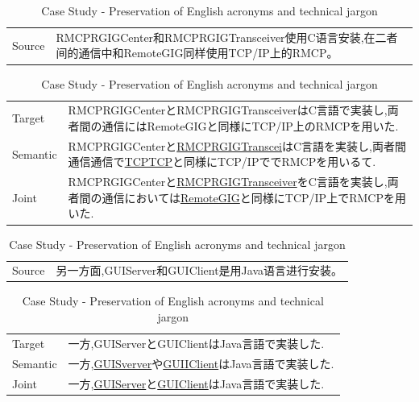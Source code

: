 \vspace{0.4cm}
\begin{table}[h]
    \centering

    \begin{CJK}{UTF8}{gbsn}
        \begin{tabularx}{\textwidth}{p{1.2cm}b}\toprule
            Source & RMCPRGIGCenter和RMCPRGIGTransceiver使用C语言安装,在二者间的通信中和RemoteGIG同样使用TCP/IP上的RMCP。 \\
        \end{tabularx}
    \end{CJK}

    \begin{CJK}{UTF8}{ipxm}
        \begin{tabularx}{\textwidth}{p{1.2cm}b}
            Target & RMCPRGIGCenterとRMCPRGIGTransceiverはC言語で実装し,両者間の通信にはRemoteGIGと同様にTCP/IP上のRMCPを用いた. \\
            Semantic & RMCPRGIGCenterと\underline{RMCPRGIGTranscei}はC言語を実装し,両者間通信通信で\underline{TCPTCP}と同様にTCP/IPででRMCPを用いるて. \\
            Joint & RMCPRGIGCenterと\underline{RMCPRGIGTransceiver}をC言語を実装し,両者間の通信においては\underline{RemoteGIG}と同様にTCP/IP上でRMCPを用いた. \\\midrule
        \end{tabularx}
    \end{CJK}

    \begin{CJK}{UTF8}{gbsn}
        \begin{tabularx}{\textwidth}{p{1.2cm}b}
            Source & 另一方面,GUIServer和GUIClient是用Java语言进行安装。 \\
        \end{tabularx}
    \end{CJK}

    \begin{CJK}{UTF8}{ipxm}
        \begin{tabularx}{\textwidth}{p{1.2cm}b}
            Target & 一方,GUIServerとGUIClientはJava言語で実装した. \\
            Semantic & 一方,\underline{GUISverver}や\underline{GUIIClient}はJava言語で実装した. \\
            Joint & 一方,\underline{GUIServer}と\underline{GUIClient}はJava言語で実装した. \\\midrule
        \end{tabularx}
    \end{CJK}

    \caption{Case Study - Preservation of English acronyms and technical jargon}
    \label{tab:case_study3}
\end{table}


